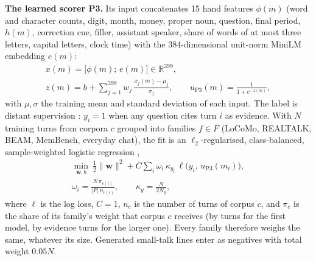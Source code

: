 \textbf{The learned scorer P3.} Its input concatenates 15 hand features
$\phi(m)$ (word and character counts, digit, month, money, proper noun,
question, final period, $h(m)$, correction cue, filler, assistant speaker,
share of words of at most three letters, capital letters, clock time) with the
384-dimensional unit-norm MiniLM embedding $e(m)$:
\begin{equation}
\label{eq:lr}
\begin{gathered}
x(m)=\big[\phi(m);\,e(m)\big]\in\mathbb{R}^{399},\\
z(m)=b+\sum_{j=1}^{399} w_j\,\frac{x_j(m)-\mu_j}{\sigma_j},\qquad
u_{\mathrm{P3}}(m)=\frac{1}{1+e^{-z(m)}},
\end{gathered}
\end{equation}
with $\mu,\sigma$ the training mean and standard deviation of each input. The
label is distant supervision \cite{mintz2009distant}: $y_i=1$ when any
question cites turn $i$ as evidence. With $N$ training turns from corpora $c$
grouped into families $f\in F$ (LoCoMo, REALTALK, BEAM, MemBench, everyday
chat), the fit is an $\ell_2$-regularised, class-balanced, sample-weighted
logistic regression \cite{pedregosa2011sklearn},
\begin{equation}
\label{eq:loss}
\begin{gathered}
\min_{\mathbf{w},b}\ \tfrac12\lVert\mathbf{w}\rVert^2
 + C\sum_{i}\omega_i\,\kappa_{y_i}\,\ell\big(y_i,\,u_{\mathrm{P3}}(m_i)\big),\\
\omega_i=\frac{N\,\pi_{c(i)}}{|F|\,n_{c(i)}},\qquad
\kappa_y=\frac{N}{2N_y},
\end{gathered}
\end{equation}
where $\ell$ is the log loss, $C=1$, $n_c$ is the number of turns of corpus
$c$, and $\pi_c$ is the share of its family's weight that corpus $c$ receives
(by turns for the first model, by evidence turns for the larger one). Every
family therefore weighs the same, whatever its size. Generated small-talk
lines enter as negatives with total weight $0.05N$.


